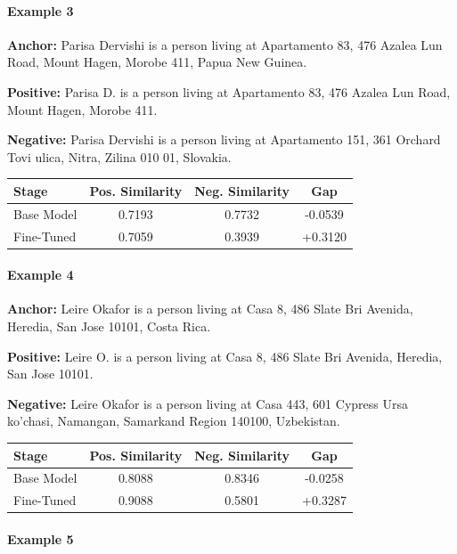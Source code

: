 \documentclass{article}
\begin{document}
\paragraph{Example 3}

\textbf{Anchor:} Parisa Dervishi is a person living at Apartamento 83, 476 Azalea Lun Road, Mount Hagen, Morobe 411, Papua New Guinea.

\textbf{Positive:} Parisa D. is a person living at Apartamento 83, 476 Azalea Lun Road, Mount Hagen, Morobe 411.

\textbf{Negative:} Parisa Dervishi is a person living at Apartamento 151, 361 Orchard Tovi ulica, Nitra, Zilina 010 01, Slovakia.

\begin{center}
\small
\begin{tabular}{lccc}
\toprule
Stage & Pos. Similarity & Neg. Similarity & Gap \\
\midrule
Base Model & 0.7193 & 0.7732 & -0.0539 \\
Fine-Tuned & 0.7059 & 0.3939 & +0.3120 \\
\bottomrule
\end{tabular}
\end{center}

\paragraph{Example 4}

\textbf{Anchor:} Leire Okafor is a person living at Casa 8, 486 Slate Bri Avenida, Heredia, San Jose 10101, Costa Rica.

\textbf{Positive:} Leire O. is a person living at Casa 8, 486 Slate Bri Avenida, Heredia, San Jose 10101.

\textbf{Negative:} Leire Okafor is a person living at Casa 443, 601 Cypress Ursa ko'chasi, Namangan, Samarkand Region 140100, Uzbekistan.

\begin{center}
\small
\begin{tabular}{lccc}
\toprule
Stage & Pos. Similarity & Neg. Similarity & Gap \\
\midrule
Base Model & 0.8088 & 0.8346 & -0.0258 \\
Fine-Tuned & 0.9088 & 0.5801 & +0.3287 \\
\bottomrule
\end{tabular}
\end{center}

\paragraph{Example 5}
\end{document}
